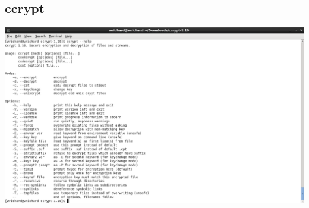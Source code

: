 \documentclass[a4paper,10pt]{article}
\begin{document}
\subsection{ccrypt}
  \begin{center}
  \includegraphics[width=\linewidth]{./ccrypt.png}
  \end{center}
\end{document}
